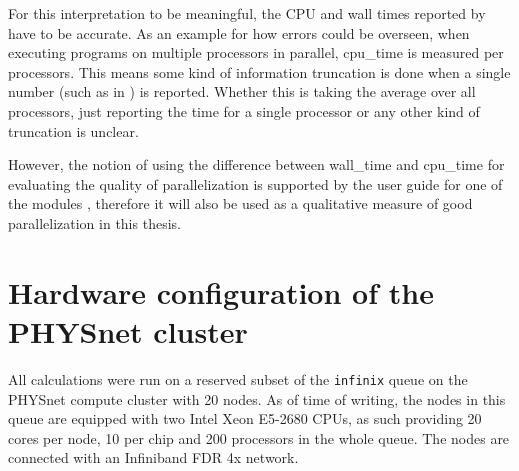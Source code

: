 \documentclass[main.tex]{subfiles}
\begin{document}
For this interpretation to be meaningful, the CPU and wall times reported by \QE have to be accurate.
As an example for how errors could be overseen, when executing programs on multiple processors in parallel, \gls{cpu_time} is measured per processors.
This means some kind of information truncation is done when a single number (such as in \QE) is reported.
Whether this is taking the average over all processors, just reporting the time for a single processor or any other kind of truncation is unclear.

However, the notion of using the difference between \gls{wall_time} and \gls{cpu_time} for evaluating the quality of parallelization is supported by the user guide for one of the \QE modules \cite[sec. 4.5]{noauthor_pwscf_nodate}, therefore it will also be used as a qualitative measure of good parallelization in this thesis.

\section{Hardware configuration of the PHYSnet cluster}\label{sec:hardware_physnet}

All calculations were run on a reserved subset of the \texttt{infinix} queue on the PHYSnet compute cluster with 20 nodes.
As of time of writing, the nodes in this queue are equipped with two Intel Xeon E5-2680 CPUs, as such providing 20 cores per node, 10 per chip and 200 processors in the whole queue.
The nodes are connected with an Infiniband FDR 4x network.
\end{document}
